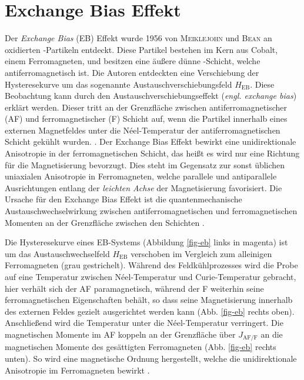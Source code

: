 \documentclass[page,pdftex,12pt,a4paper,twoside,openright]{scrbook}
\begin{document}
\section{Exchange Bias Effekt \label{sec-EB}}
\label{sec:org6c07692}
Der \emph{Exchange Bias} (EB) Effekt  wurde 1956 von \textsc{Meiklejohn} und \textsc{Bean} an oxidierten -Partikeln entdeckt. Diese Partikel bestehen im Kern aus Cobalt, einem Ferromagneten, und besitzen eine äußere dünne -Schicht, welche antiferromagnetisch ist. Die Autoren entdeckten eine Verschiebung der Hysteresekurve um das sogenannte Austauschverschiebungsfeld \(H_\mathrm{EB}\). Diese Beobachtung kann durch den Austauschverschiebungseffekt (\emph{engl. exchange bias}) erklärt werden. Dieser tritt an der Grenzfläche zwischen antiferromagnetischer (AF) und ferromagnetischer (F) Schicht auf, wenn die Partikel innerhalb eines externen Magnetfeldes unter die Néel-Temperatur der antiferromagnetischen Schicht gekühlt wurden. \cite{meiklejohn_new_1957} .
Der Exchange Bias Effekt bewirkt eine unidirektionale Anisotropie in der ferromagnetischen Schicht, das heißt es wird nur eine Richtung für die Magnetisierung bevorzugt. Dies steht im Gegensatz zur sonst üblichen uniaxialen Anisotropie in Ferromagneten, welche parallele und antiparallele Ausrichtungen entlang der \emph{leichten Achse} der Magnetisierung favorisiert. Die Ursache für den Exchange Bias Effekt ist die quantenmechanische Austauschwechselwirkung zwischen antiferromagnetischen und ferromagnetischen Momenten an der Grenzfläche zwischen den Schichten \cite{stohr_magnetism_2006}. 

Die Hysteresekurve eines EB-Systems (Abbildung \ref{fig-eb} links in magenta) ist um das Austauschwechselfeld \(H_\mathrm{EB}\) verschoben im Vergleich zum alleinigen Ferromagneten (grau gestrichelt). Während des Feldkühlprozesses wird die Probe auf eine Temperatur zwischen Néel-Temperatur und Curie-Temperatur gebracht, hier verhält sich der AF paramagnetisch, während der F weiterhin seine ferromagnetischen Eigenschaften behält, so dass seine Magnetisierung innerhalb des externen Feldes gezielt ausgerichtet werden kann (Abb. \ref{fig-eb} rechts oben). Anschließend wird die Temperatur unter die Néel-Temperatur verringert. Die magnetischen Momente im AF koppeln an der Grenzfläche über \(J_\mathrm{AF/F}\) an die magnetischen Momente des gesättigten Ferromagneten (Abb. \ref{fig-eb} rechts unten). So wird eine magnetische Ordnung hergestellt, welche die unidirektionale Anisotropie im Ferromagneten bewirkt \cite{merkel_einfluss_2018}.
\end{document}

